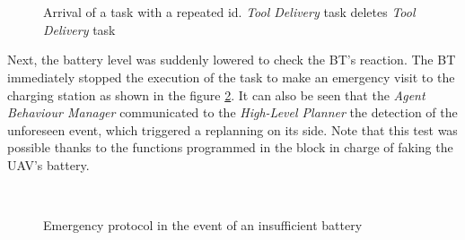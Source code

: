 \begin{figure}[htbp]
    \centering
    \hfill
    \\
    \hfill
    \\
        \hfill
    \caption{Arrival of a task with a repeated id. \emph{Tool Delivery} task deletes \emph{Tool Delivery} task}
    \label{fig:event_DuplicatedID}
\end{figure}

Next, the battery level was suddenly lowered to check the \gls{BT}'s reaction. The \gls{BT} immediately stopped the execution of the task to make an emergency visit to the charging station as shown in the figure \ref{fig:event_battery}. It can also be seen that the \emph{Agent Behaviour Manager} communicated to the \emph{High-Level Planner} the detection of the unforeseen event, which triggered a replanning on its side. Note that this test was possible thanks to the functions programmed in the block in charge of faking the \gls{UAV}'s battery.

\begin{figure}[htbp]
    \centering
    \hfill
    \\
        \hfill
    \caption{Emergency protocol in the event of an insufficient battery}
    \label{fig:event_battery}
\end{figure}

